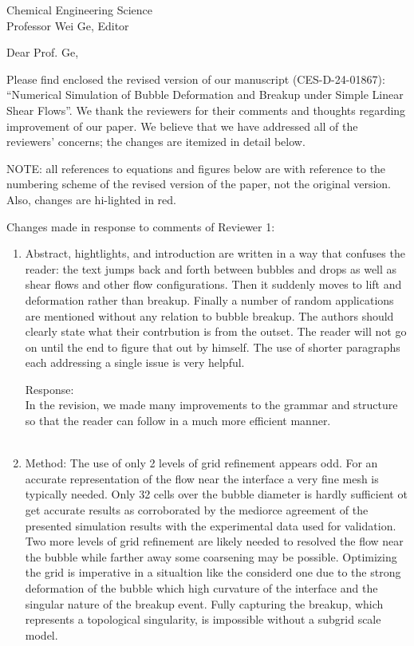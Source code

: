 \documentclass{letter}
\date{\today}
\begin{document}
\begin{letter}{
Chemical Engineering Science\\
Professor Wei Ge, Editor\\}

\opening{Dear Prof. Ge,}

Please find enclosed the revised version of our manuscript (CES-D-24-01867):
``Numerical Simulation of Bubble Deformation and Breakup under 
Simple Linear Shear Flows''.
We thank the reviewers for their comments and thoughts regarding improvement 
of our paper. We believe that we have addressed all of the reviewers’ 
concerns; the changes are itemized in detail below.

\par\noindent
NOTE: all references to equations and figures below are with
reference to the numbering scheme of the revised version of the paper,
not the original version.  Also, changes are hi-lighted in red.
\par\noindent

Changes made in response to comments of Reviewer 1: \begin{enumerate}
\item
\textsf
{Abstract, hightlights, and introduction are written in a way that confuses the reader: the text jumps back and forth between bubbles and drops as well as shear flows and other flow configurations. Then it suddenly moves to lift and deformation rather than breakup. Finally a number of random applications are mentioned without any relation to bubble breakup. The authors should clearly state what their contrbution is from the outset. The reader will not go on until the end to figure that out by himself. The use of shorter paragraphs each addressing a single issue is very helpful.}
\vspace{3 mm}

Response: \\
In the revision, we made many improvements to the grammar and structure so that the reader can follow in a much more efficient manner. \\
\\

\item
\textsf
{Method: The use of only 2 levels of grid refinement appears odd. For an accurate representation of the flow near the interface a very fine mesh is typically needed. Only 32 cells over the bubble diameter is hardly sufficient ot get accurate results as corroborated by the mediorce agreement of the presented simulation results with the experimental data used for validation. Two more levels of grid refinement are likely needed to resolved the flow near the bubble while farther away some coarsening may be possible. Optimizing the grid is imperative in a situaltion like the considerd one due to the strong deformation of the bubble which high curvature of the interface and the singular nature of the breakup event. Fully capturing the breakup, which represents a topological singularity, is impossible without a subgrid scale model.}
\vspace{3 mm}


\end{enumerate}
\end{letter}
\end{document}
